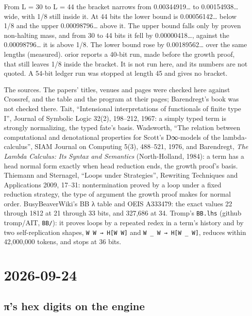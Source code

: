 From L = 30 to L = 44 the bracket narrows from 0.00344919… to 0.00154938… wide, with 1/8 still inside it. At 44 bits the lower bound is 0.00056142… below 1/8 and the upper 0.00098796… above it. The upper bound falls only by proven non-halting mass, and from 30 to 44 bits it fell by 0.00000418…, against the 0.00098796… it is above 1/8. The lower bound rose by 0.00189562… over the same lengths (measured). orior reports a 40-bit run, made before the growth proof, that still leaves 1/8 inside the bracket. It is not run here, and its numbers are not quoted. A 54-bit ledger run was stopped at length 45 and gives no bracket.

The sources. The papers' titles, venues and pages were checked here against Crossref, and the table and the program at their pages; Barendregt's book was not checked there. Tait, “Intensional interpretations of functionals of finite type I”, Journal of Symbolic Logic 32(2), 198–212, 1967: a simply typed term is strongly normalizing, the typed fate's basis. Wadsworth, “The relation between computational and denotational properties for Scott's D∞-models of the lambda-calculus”, SIAM Journal on Computing 5(3), 488–521, 1976, and Barendregt, \emph{The Lambda Calculus: Its Syntax and Semantics} (North-Holland, 1984): a term has a head normal form exactly when head reduction ends, the growth proof's basis. Thiemann and Sternagel, “Loops under Strategies”, Rewriting Techniques and Applications 2009, 17–31: nontermination proved by a loop under a fixed reduction strategy, the type of argument the growth proof makes for normal order. BusyBeaverWiki's BB λ table and OEIS A333479: the exact values 22 through 1812 at 21 through 33 bits, and 327,686 at 34. Tromp's \texttt{BB.\allowbreak{}lhs} (github tromp/AIT, \texttt{BB/\allowbreak{}}): it proves loops by a repeated redex in a term's history and by two self-replication shapes, \texttt{W W → H[W W]} and \texttt{W \_\allowbreak{} W → H[W \_\allowbreak{} W]}, reduces within 42,000,000 tokens, and stops at 36 bits.

\section{\texorpdfstring{2026-09-24}{2026-09-24}}

\subsection{\texorpdfstring{π's hex digits on the engine}{π's hex digits on the engine}}


